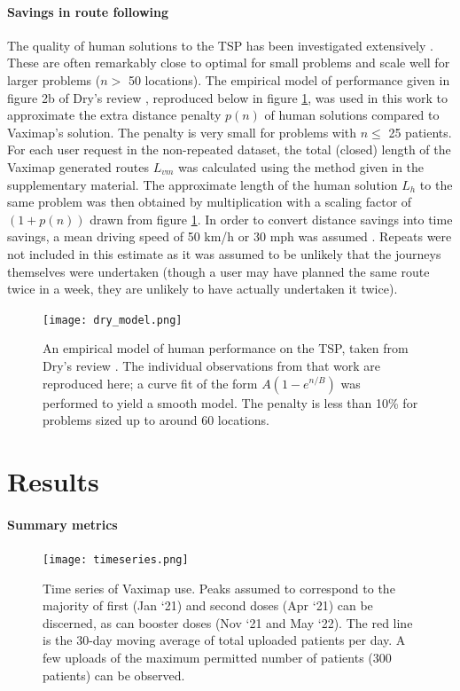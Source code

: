 \documentclass{article}
\def\vm{Vaximap}
\begin{document}
\paragraph{Savings in route following}
The quality of human solutions to the TSP has been investigated extensively \cite{Macgregor1996, MacGregor2011, Vickers2001, MacGregor1999a}. These are often remarkably close to optimal for small problems and scale well  for larger problems ($n > $ 50 locations). The empirical model of performance given in figure 2b of Dry's review \cite{Dry2006}, reproduced below in figure \ref{dry_model}, was used in this work to approximate the extra distance penalty $p(n)$ of human solutions compared to \vm{}'s solution. The penalty is very small for problems with $n \leq$ 25 patients. For each user request in the non-repeated dataset, the total (closed) length of the \vm{} generated routes $L_{vm}$ was calculated using the method given in the supplementary material. The approximate length of the human solution $L_h$ to the same problem was then obtained by multiplication with a scaling factor of $(1 + p(n))$ drawn from figure \ref{dry_model}. In order to convert distance savings into time savings, a mean driving speed of 50 km/h or 30 mph was assumed \cite{Balendra2020}. Repeats were not included in this estimate as it was assumed to be unlikely that the journeys themselves were undertaken (though a user may have planned the same route twice in a week, they are unlikely to have actually undertaken it twice).  

\begin{figure}[H]
\centering
\texttt{[image: dry\_model.png]}
\caption{An empirical model of human performance on the TSP, taken from Dry's review \cite{Dry2006}. The individual observations from that work are reproduced here; a curve fit of the form $A(1 - e^{n/B})$ was performed to yield a smooth model. The penalty is less than 10\% for problems sized up to around 60 locations.}
\label{dry_model}
\end{figure}

\section{Results}

\paragraph{Summary metrics}
\begin{figure}[H]
\centering
\texttt{[image: timeseries.png]}
\caption{Time series of Vaximap use. Peaks assumed to correspond to the majority of first (Jan `21) and second doses (Apr `21) can be discerned, as can booster doses (Nov  `21 and May `22). The red line is the 30-day moving average of total uploaded patients per day. A few uploads of the maximum permitted number of patients (300 patients) can be observed.}
\label{timeseries}
\end{figure}
\end{document}
